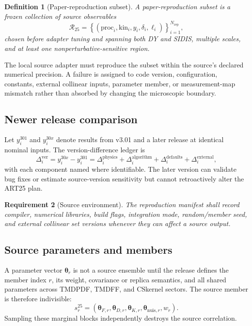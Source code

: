 \documentclass[11pt]{article}
\newtheorem{definition}{Definition}[section]
\newtheorem{requirement}[definition]{Requirement}
\newcommand{\CS}{\ensuremath{\mathrm{CS}}}
\begin{document}
\begin{definition}[Paper-reproduction subset]
A paper-reproduction subset is a frozen collection of source observables
\begin{equation}
 \mathcal R_{25}
 =
 \left\{
 (\mathrm{proc}_i,\mathrm{kin}_i,y_i,\delta_i,\ell_i)
 \right\}_{i=1}^{N_{\mathrm{rep}}},
 \label{eq:paper-reproduction-set}
\end{equation}
chosen before adapter tuning and spanning both DY and SIDIS, multiple scales, and at least one nonperturbative-sensitive region.
\end{definition}

The local source adapter must reproduce the subset within the source's declared numerical precision.  A failure is assigned to code version, configuration, constants, external collinear inputs, parameter member, or measurement-map mismatch rather than absorbed by changing the microscopic boundary.

\subsection{Newer release comparison}

Let \(y_i^{301}\) and \(y_i^{30x}\) denote results from v3.01 and a later release at identical nominal inputs.  The version-difference ledger is
\begin{equation}
 \Delta_i^{\mathrm{ver}}
 =
 y_i^{30x}-y_i^{301}
 =
 \Delta_i^{\mathrm{physics}}
 +\Delta_i^{\mathrm{algorithm}}
 +\Delta_i^{\mathrm{defaults}}
 +\Delta_i^{\mathrm{external}},
 \label{eq:version-difference}
\end{equation}
with each component named where identifiable.  The later version can validate bug fixes or estimate source-version sensitivity but cannot retroactively alter the ART25 plan.

\begin{requirement}[Source environment]
The reproduction manifest shall record compiler, numerical libraries, build flags, integration mode, random/member seed, and external collinear set versions whenever they can affect a source output.
\end{requirement}

\subsection{Source parameters and members}

A parameter vector \(\bm\theta_r\) is not a source ensemble until the release defines the member index \(r\), its weight, covariance or replica semantics, and all shared parameters across TMDPDF, TMDFF, and \CS kernel sectors.  The source member is therefore indivisible:
\begin{equation}
 s_r^{25}
 =
 \left(
 \bm\theta_{F,r},
 \bm\theta_{D,r},
 \bm\theta_{K,r},
 \bm\theta_{\mathrm{nuis},r},
 w_r
 \right).
 \label{eq:art25-member}
\end{equation}
Sampling these marginal blocks independently destroys the source correlation.
\end{document}
